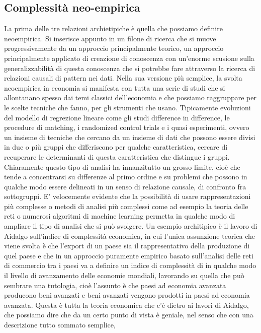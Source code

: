 \documentclass[a4paper, headings=standardclasses]{scrartcl}
\begin{document}
\subsection{Complessità neo-empirica}
La prima delle tre relazioni archietipiche è quella che possiamo definire neoempirica.
Si inserisce appunto in un filone di ricerca che si muove progressivamente da un approccio
principalmente teorico, un approccio principalmente applicato di creazione di conoscenza
con un'enorme scusione sulla generalizzabilità di questa conoscenza che si potrebbe fare
attraverso la ricerca di relazioni causali di pattern nei dati.
Nella sua versione più semplice, la svolta neoempirica in economia si manifesta con tutta una serie di studi
che si allontanano spesso dai temi classici dell'economia
e che possiamo raggruppare per le scelte tecniche che fanno, per gli strumenti che usano.
Tipicamente evoluzioni del modello di regrezione lineare come gli studi difference in difference,
le procedure di matching, i randomized control trials e i quasi esperimenti,
ovvero un insieme di tecniche che cercano da un insieme di dati che possono essere divisi in due o più gruppi
che differiscono per qualche caratteristica, cercare di recuperare le determinanti di questa caratteristica che distingue i gruppi.
Chiaramente questo tipo di analisi ha innanzitutto un grosso limite, cioè che tende a concentrarsi su differenze al primo ordine
e su problemi che possono in qualche modo essere delineati in un senso di relazione causale,
di confronto fra sottogruppi.
E' velocemente evidente che la possibilità di usare rappresentazioni più complesse o metodi di analisi più complessi
come ad esempio la teoria delle reti o numerosi algoritmi di machine learning permetta in qualche modo di ampliare il tipo di analisi che si può svolgere.
Un esempio architipico è il lavoro di Aidalgo sull'indice di complessità economica,
in cui l'unica assunzione teorica che viene svolta è che l'export di un paese sia il rappresentativo della produzione di quel paese
e che in un approccio puramente empirico basato sull'analisi delle reti di commercio tra i paesi
va a definire un indice di complessità di in qualche modo il livello di avanzamento delle economie mondiali,
lavorando su quella che può sembrare una tutologia, cioè l'assunto è che paesi ad economia avanzata producono beni avanzati
e beni avanzati vengono prodotti in paesi ad economia avanzata.
Questa è tutta la teoria economica che c'è dietro ai lavori di Aidalgo,
che possiamo dire che da un certo punto di vista è geniale, nel senso che con una descrizione tutto sommato semplice,
\end{document}
